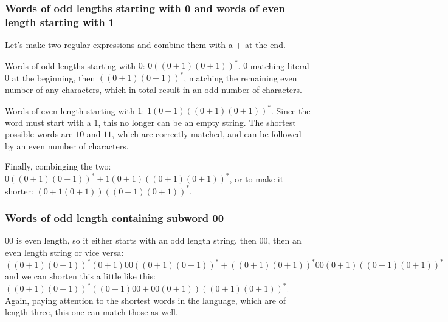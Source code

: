 \subsubsection{Words of odd lengths starting with 0 and words of even length starting with 1}

Let's make two regular expressions and combine them with a $+$ at the end.

Words of odd lengths starting with $0$: $0((0+1)(0+1))^*$. $0$ matching literal $0$ at the beginning, then $((0+1)(0+1))^*$, matching the remaining even number of any characters, which in total result in an odd number of characters.

Words of even length starting with $1$: $1(0+1)((0+1)(0+1))^*$. Since the word must start with a $1$, this no longer can be an empty string. The shortest possible words are $10$ and $11$, which are correctly matched, and can be followed by an even number of characters.

Finally, combinging the two: $0((0+1)(0+1))^* + 1(0+1)((0+1)(0+1))^*$, or to make it shorter: $(0 + 1(0+1))((0+1)(0+1))^*$.

\subsubsection{Words of odd length containing subword 00}

$00$ is even length, so it either starts with an odd length string, then $00$, then an even length string or vice versa: $((0+1)(0+1))^*(0+1)00((0+1)(0+1))^* + ((0+1)(0+1))^*00(0+1)((0+1)(0+1))^*$ and we can shorten this a little like this: $((0+1)(0+1))^*((0+1)00+00(0+1))((0+1)(0+1))^*$. Again, paying attention to the shortest words in the language, which are of length three, this one can match those as well.

